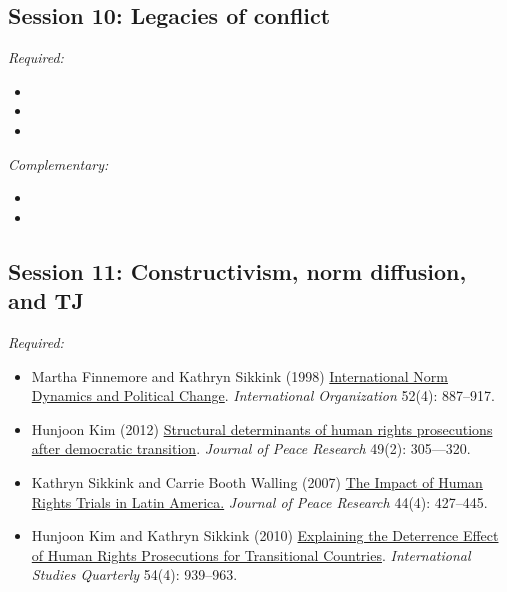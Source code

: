 \documentclass[12pt, a4paper]{article}
\begin{document}
\subsection*{Session 10: Legacies of conflict}

\noindent\textit{Required:}

\begin{itemize}
  \item
  \item
  \item
\end{itemize}

\noindent\textit{Complementary:}

\begin{itemize}
  \item
  \item
\end{itemize}

\vspace{20pt}
\hline
\subsection*{Session 11: Constructivism, norm diffusion, and TJ}

\noindent\textit{Required:}

\begin{itemize}
	\item Martha Finnemore and Kathryn Sikkink (1998) \href{https://doi.org/10.1162/002081898550789}{International Norm Dynamics and Political Change}. \textit{International Organization} 52(4): 887--917.
  \item Hunjoon Kim (2012) \href{https://doi.org/10.1177/0022343311431600}{Structural determinants of human rights prosecutions after democratic transition}. \textit{Journal of Peace Research} 49(2): 305---320.
	\item Kathryn Sikkink and Carrie Booth Walling (2007) \href{https://doi.org/10.1177/002234330707895}{The Impact of Human Rights Trials in Latin America.} \textit{Journal of Peace Research} 44(4): 427--445.
	\item Hunjoon Kim and Kathryn Sikkink (2010) \href{https://doi.org/10.1111/j.1468-2478.2010.00621.x}{Explaining the Deterrence Effect of Human Rights Prosecutions for Transitional Countries}. \textit{International Studies Quarterly} 54(4): 939--963.
\end{itemize}

\end{document}
